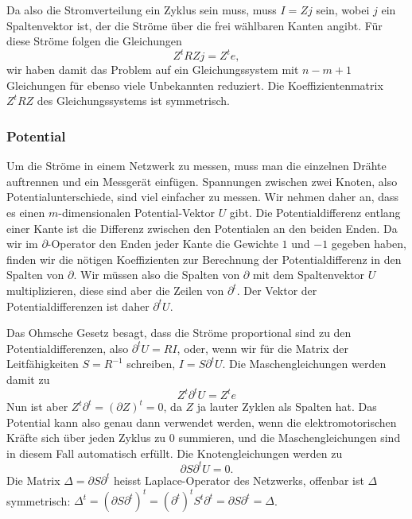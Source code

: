 Da also die Stromverteilung ein Zyklus sein muss, muss $I=Zj$ sein, wobei
$j$ ein Spaltenvektor ist, der die Ströme über die frei wählbaren
Kanten angibt. Für diese Ströme folgen die Gleichungen
\[
Z^tRZj=Z^te,
\]
wir haben damit das Problem auf ein Gleichungssystem mit $n-m+1$
Gleichungen für ebenso viele Unbekannten reduziert.
Die Koeffizientenmatrix $Z^tRZ$ des Gleichungssystems ist symmetrisch.

\subsubsection{Potential}
Um die Ströme in einem Netzwerk zu messen, muss man die einzelnen
Drähte auftrennen und ein Messgerät einfügen.
Spannungen zwischen zwei Knoten, also Potentialunterschiede,
sind viel einfacher zu messen.
Wir nehmen daher an, dass es einen $m$-dimensionalen
Potential-Vektor $U$ gibt.
Die Potentialdifferenz entlang einer Kante ist die Differenz
zwischen den Potentialen an den beiden Enden.
Da wir im $\partial$-Operator den Enden jeder Kante die Gewichte
$1$ und $-1$ gegeben haben, finden wir die nötigen Koeffizienten
zur Berechnung der Potentialdifferenz in den Spalten von $\partial$.
Wir müssen also die Spalten von $\partial$ mit dem Spaltenvektor $U$
multiplizieren, diese sind aber die Zeilen von $\partial^t$.
Der Vektor der Potentialdifferenzen ist daher $\partial^t U$.

Das Ohmsche Gesetz besagt, dass die Ströme proportional sind zu
den Potentialdifferenzen, also $\partial^t U=RI$, oder, wenn
wir für die Matrix der Leitfähigkeiten $S=R^{-1}$ schreiben,
$I=S\partial^t U$. Die Maschengleichungen werden damit zu
\[
Z^t\partial^t U=Z^te
\]
Nun ist aber $Z^t\partial^t=(\partial Z)^t=0$, da $Z$ ja lauter
Zyklen als Spalten hat. Das Potential kann also genau dann verwendet
werden, wenn die elektromotorischen Kräfte sich über jeden Zyklus zu $0$
summieren, und die
Maschengleichungen sind in diesem Fall automatisch erfüllt.
Die Knotengleichungen werden zu
\[
\partial S\partial^tU=0.
\]
Die Matrix $\Delta = \partial S\partial ^t$ heisst Laplace-Operator des
Netzwerks, offenbar ist $\Delta$ symmetrisch:
$\Delta^t=(\partial S\partial^t)^t
         =(\partial^t)^tS^t\partial^t
         =\partial S\partial^t
         =\Delta$.

